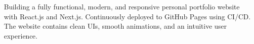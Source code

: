 \documentclass[]{main}
\begin{document}
\begin{minipage}[t]{0.66\textwidth}
Building a fully functional, modern, and responsive personal portfolio website with React.js and Next.js. Continuously deployed to GitHub Pages using CI/CD. The website contains clean UIs, smooth animations, and an intuitive user experience.

\sectionsep

\end{minipage} 
\end{document}
